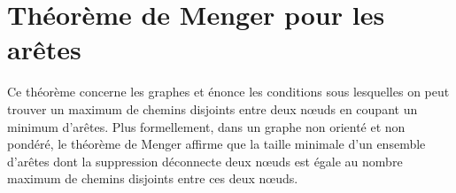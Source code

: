 \section{Théorème de Menger pour les arêtes}

Ce théorème concerne les graphes et énonce les conditions sous lesquelles on peut trouver un maximum de chemins disjoints entre deux nœuds en coupant un minimum d'arêtes. Plus formellement, dans un graphe non orienté et non pondéré, le théorème de Menger affirme que la taille minimale d'un ensemble d'arêtes dont la suppression déconnecte deux nœuds est égale au nombre maximum de chemins disjoints entre ces deux nœuds.
